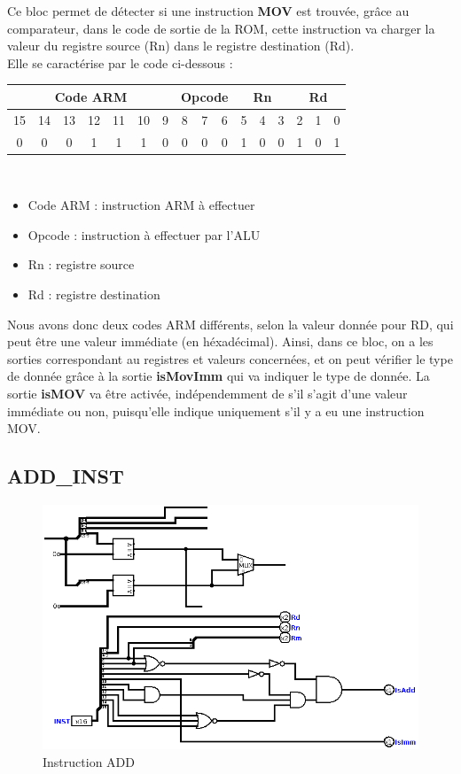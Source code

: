 \documentclass[a4paper]{article} %
\begin{document}
Ce bloc permet de détecter si une instruction \textbf{MOV} est trouvée, grâce au comparateur, dans le code de sortie de la ROM, cette instruction va charger la valeur du registre source (Rn) dans le registre destination (Rd).\\
Elle se caractérise par le code ci-dessous : 
\\
\begin{tabular}{|ccccccc|ccc|ccc|ccc|}
    \hline
    \multicolumn{7}{|c|}{Code ARM}  & \multicolumn{3}{|c|}{Opcode} & \multicolumn{3}{|c|}{Rn} & \multicolumn{3}{|c|}{Rd}\\
    \hline
    15 & 14 & 13 & 12 & 11 & 10 & 9 & 8 & 7 & 6                    & 5 & 4 & 3                & 2 & 1 & 0 \\
    \hline
    0  & 0  & 0  & 1  & 1  & 1  & 0 & 0 & 0 & 0                    & 1 & 0 & 0                & 1 & 0 & 1 \\
    \hline     
    \end{tabular}
\\

\begin{itemize}
    \item     Code ARM : instruction ARM à effectuer
    \item     Opcode : instruction à effectuer par l'ALU
    \item     Rn : registre source
    \item     Rd : registre destination
\end{itemize}

\medskip
Nous avons donc deux codes ARM différents, selon la valeur donnée pour RD, qui peut être une valeur immédiate (en héxadécimal). Ainsi, dans ce bloc, on a les sorties correspondant au registres et valeurs concernées, et on peut vérifier le type de donnée grâce à la sortie \textbf{isMovImm} qui va indiquer le type de donnée. La sortie \textbf{isMOV} va être activée, indépendemment de s'il s'agit d'une valeur immédiate ou non, puisqu'elle indique uniquement s'il y a eu une instruction MOV.


\subsection{ADD\_INST} \label{addinst}
\begin{figure}[H]
    \centering
    \includegraphics[width=.8\textwidth]{src/ADD_INST.png}
    \caption{Instruction ADD}
    \label{add_img}
\end{figure}
\end{document}
